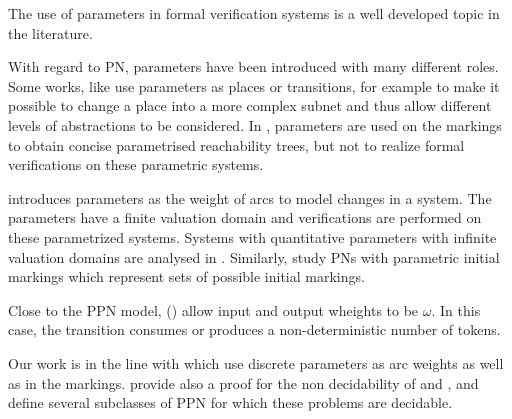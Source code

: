 The use of parameters in formal verification systems is a well developed topic in the literature.

With regard to \ac{PN}, parameters have been introduced with many different roles.
Some works, like \cite{Christensen97} use parameters as places or transitions, for example to make it possible to change a place into a more complex subnet and thus allow different levels of abstractions to be considered.
In \cite{Lindqvist91}, parameters are used on the markings to obtain concise parametrised reachability trees, but not to realize formal verifications on these parametric systems.

\cite{Badouel99} introduces parameters as the weight of arcs to model changes in a system.
The parameters have a finite valuation domain and verifications are performed on these parametrized systems.
Systems with quantitative parameters with infinite valuation domains are analysed in \cite{Abdulla13}.
Similarly, \cite{Marsan94} study \acp{PN} with parametric initial markings which represent sets of possible initial markings.

Close to the \ac{PPN} model, \opns (\cite{Geeraerts15}) allow input and output wheights to be $\omega$. In this case, the transition consumes or produces a non-deterministic number of tokens.

Our work is in the line with \cite{David17} which use discrete parameters as arc weights as well as in the markings.
\cite{David17} provide also a proof for the non decidability of \Ucov and \Ecov, and define several subclasses of \ac{PPN} for which these problems are decidable.

